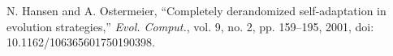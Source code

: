 N. Hansen and A. Ostermeier, ``Completely derandomized self-adaptation in evolution strategies,'' \textit{Evol. Comput.}, vol. 9, no. 2, pp. 159--195, 2001, doi: 10.1162/106365601750190398.
